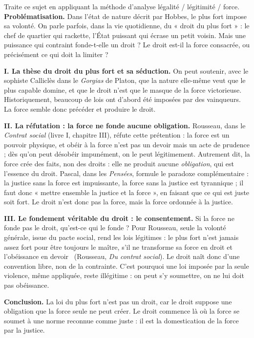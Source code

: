 \documentclass[11pt]{article}
\begin{document}
\begin{exoresolu}
Traite ce sujet en appliquant la méthode d'analyse légalité / légitimité / force.
\tcblower
\textbf{Problématisation.} Dans l'état de nature décrit par Hobbes, le plus fort impose sa volonté. On parle parfois, dans la vie quotidienne, du « droit du plus fort » : le chef de quartier qui rackette, l'État puissant qui écrase un petit voisin. Mais une puissance qui contraint fonde-t-elle un droit ? Le droit est-il la force consacrée, ou précisément ce qui doit la limiter ?

\textbf{I. La thèse du droit du plus fort et sa séduction.} On peut soutenir, avec le sophiste Calliclès dans le \emph{Gorgias} de Platon, que la nature elle-même veut que le plus capable domine, et que le droit n'est que le masque de la force victorieuse. Historiquement, beaucoup de lois ont d'abord été imposées par des vainqueurs. La force semble donc précéder et produire le droit.

\textbf{II. La réfutation : la force ne fonde aucune obligation.} Rousseau, dans le \emph{Contrat social} (livre I, chapitre III), réfute cette prétention : la force est un pouvoir physique, et obéir à la force n'est pas un devoir mais un acte de prudence ; dès qu'on peut désobéir impunément, on le peut légitimement. Autrement dit, la force crée des faits, non des droits : elle ne produit aucune \emph{obligation}, qui est l'essence du droit. Pascal, dans les \emph{Pensées}, formule le paradoxe complémentaire : la justice sans la force est impuissante, la force sans la justice est tyrannique ; il faut donc « mettre ensemble la justice et la force », en faisant que ce qui est juste soit fort. Le droit n'est donc pas la force, mais la force ordonnée à la justice.

\textbf{III. Le fondement véritable du droit : le consentement.} Si la force ne fonde pas le droit, qu'est-ce qui le fonde ? Pour Rousseau, seule la volonté générale, issue du pacte social, rend les lois légitimes : \guillemotleft le plus fort n'est jamais assez fort pour être toujours le maître, s'il ne transforme sa force en droit et l'obéissance en devoir \guillemotright\ (Rousseau, \emph{Du contrat social}). Le droit naît donc d'une convention libre, non de la contrainte. C'est pourquoi une loi imposée par la seule violence, même appliquée, reste illégitime : on peut s'y soumettre, on ne lui doit pas obéissance.

\textbf{Conclusion.} La loi du plus fort n'est pas un droit, car le droit suppose une obligation que la force seule ne peut créer. Le droit commence là où la force se soumet à une norme reconnue comme juste : il est la domestication de la force par la justice.
\end{exoresolu}
\end{document}
